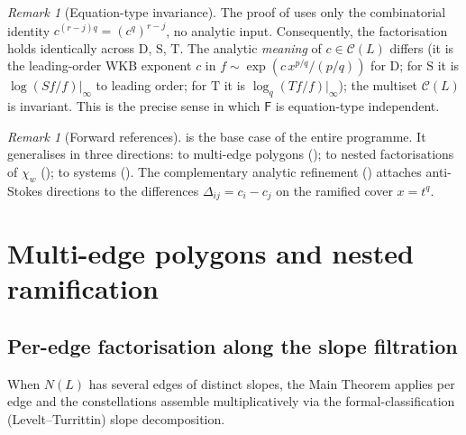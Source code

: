 \documentclass[11pt,a4paper]{article}
\theoremstyle{plain}
\theoremstyle{definition}
\theoremstyle{remark}
\newtheorem{remark}[theorem]{Remark}
\newcommand{\opD}{\mathrm{D}}                     %
\newcommand{\opS}{\mathrm{S}}                     %
\newcommand{\opT}{\mathrm{T}}                     %
\newcommand{\Cl}{\mathcal{C}}
\newcommand{\Fclass}{\mathsf{F}}
\newcommand{\Dij}{\Delta_{ij}}
\begin{document}
\begin{remark}[Equation-type invariance]\label{rem:eq-invariance}
The proof of  uses only the combinatorial identity
$c^{(r-j)q} = (c^q)^{r-j}$, no analytic input. Consequently, the
factorisation holds identically across $\opD$, $\opS$, $\opT$. The analytic
\emph{meaning} of $c \in \Cl(L)$ differs (it is the leading-order WKB
exponent $c$ in $f \sim \exp(c\, x^{p/q}/(p/q))$ for $\opD$; for $\opS$ it
is $\log(S f / f)|_\infty$ to leading order; for $\opT$ it is
$\log_q(T f / f)|_\infty$); the multiset $\Cl(L)$ is invariant. This is
the precise sense in which $\Fclass$ is equation-type independent.
\end{remark}

\begin{remark}[Forward references]\label{rem:forward-main}
 is the base case of the entire programme. It generalises
in three directions: to multi-edge polygons (); to nested
factorisations of $\chi_w$ (); to systems ().
The complementary analytic refinement
() attaches anti-Stokes directions
to the differences $\Dij = c_i - c_j$ on the ramified cover $x = t^q$.
\end{remark}


\section{Multi-edge polygons and nested ramification}\label{sec:multiedge}

\subsection{Per-edge factorisation along the slope filtration}\label{ssec:M1}

When $N(L)$ has several edges of distinct slopes, the Main Theorem applies
per edge and the constellations assemble multiplicatively via the
formal-classification (Levelt--Turrittin) slope decomposition.
\end{document}
